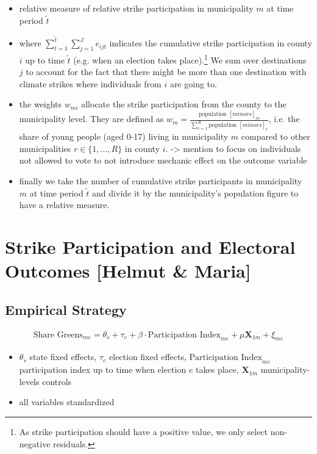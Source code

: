 \begin{itemize}
	\item relative measure of relative strike participation in municipality $m$ at time period $\tilde{t}$
	\item where $\sum_{t=1}^{\tilde{t}}\sum_{j=1}^{J} e_{ijt}$ indicates the cumulative strike participation in county $i$ up to time $\tilde{t}$ (e.g. when an election takes place).\footnote{As strike participation should have a positive value, we only select non-negative residuals.} We sum over destinations $j$ to account for the fact that there might be more than one destination with climate strikes where individuals from $i$ are going to.
	\item the weights $w_{mi}$ allocate the strike participation from the county to the municipality level. They are defined as $w_m=\tfrac{\text{population }[minors]_m}{\sum_{r=1}^{R}\text{population }[minors]_r}$, i.e. the share of young people (aged 0-17) living in municipality $m$ compared to other municipalities $r\in\{1,...,R\}$ in county $i$. -> mention to focus on individuals not allowed to vote to not introduce mechanic effect on the outcome variable
	\item finally we take the number of cumulative strike participants in municipality $m$ at time period $\tilde{t}$ and divide it by the municipality's population figure to have a relative measure.
\end{itemize}















\clearpage
\section{Strike Participation and Electoral Outcomes [Helmut \& Maria]}\label{sec_greta_cons:strike_participation_elections}
\subsection{Empirical Strategy}

\begin{align}
	\text{Share Greens}_{me} = \theta_s + \tau_e + \beta\cdot\text{Participation Index}_{me} + \mu \mathbf{X}_{1m} + \xi_{me}\label{eq_greta_cons:vote_share_greens}
\end{align}
\begin{itemize}
	\item $\theta_s$ state fixed effects, $\tau_e$ election fixed effects, $\text{Participation Index}_{me}$ participation index up to time when election $e$ takes place, $\mathbf{X}_{1m}$ municipality-levels controls 
	\item all variables standardized
\end{itemize}

